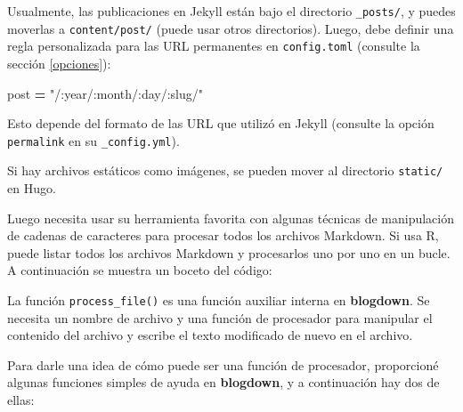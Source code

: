 \documentclass[12pt,]{krantz}
\makeatletter
\newenvironment{Shaded}{\begin{snugshade}}{\end{snugshade}}
\newcommand{\CommentTok}[1]{\textcolor[rgb]{0.56,0.35,0.01}{\textit{#1}}}
\newcommand{\ControlFlowTok}[1]{\textcolor[rgb]{0.13,0.29,0.53}{\textbf{#1}}}
\newcommand{\DataTypeTok}[1]{\textcolor[rgb]{0.13,0.29,0.53}{#1}}
\newcommand{\KeywordTok}[1]{\textcolor[rgb]{0.13,0.29,0.53}{\textbf{#1}}}
\newcommand{\NormalTok}[1]{#1}
\newcommand{\OperatorTok}[1]{\textcolor[rgb]{0.81,0.36,0.00}{\textbf{#1}}}
\newcommand{\OtherTok}[1]{\textcolor[rgb]{0.56,0.35,0.01}{#1}}
\newcommand{\StringTok}[1]{\textcolor[rgb]{0.31,0.60,0.02}{#1}}
\newenvironment{kframe}{%
\medskip{}
\setlength{\fboxsep}{.8em}
 \def\at@end@of@kframe{}%
 \ifinner\ifhmode%
  \def\at@end@of@kframe{\end{minipage}}%
  \begin{minipage}{\columnwidth}%
 \fi\fi%
 \def\FrameCommand##1{\hskip\@totalleftmargin \hskip-\fboxsep
 \colorbox{shadecolor}{##1}\hskip-\fboxsep
     \hskip-\linewidth \hskip-\@totalleftmargin \hskip\columnwidth}%
 \MakeFramed {\advance\hsize-\width
   \@totalleftmargin\z@ \linewidth\hsize
   \@setminipage}}%
 {\par\unskip\endMakeFramed%
 \at@end@of@kframe}
\renewenvironment{Shaded}{\begin{kframe}}{\end{kframe}}
\theoremstyle{definition}
\theoremstyle{definition}
\theoremstyle{definition}
\theoremstyle{remark}
\makeatother
\begin{document}
Usualmente, las publicaciones en Jekyll están bajo el directorio
\texttt{\_posts/}, y puedes moverlas a \texttt{content/post/} (puede
usar otros directorios). Luego, debe definir una regla personalizada
para las URL permanentes en \texttt{config.toml} (consulte la sección
\ref{opciones}):

\begin{Shaded}
\begin{Highlighting}[]
\NormalTok{[permalinks]}
\NormalTok{    post }\OperatorTok{=} \StringTok{"/:year/:month/:day/:slug/"}
\end{Highlighting}
\end{Shaded}

Esto depende del formato de las URL que utilizó en Jekyll (consulte la
opción \texttt{permalink} en su \texttt{\_config.yml}).

Si hay archivos estáticos como imágenes, se pueden mover al directorio
\texttt{static/} en Hugo.

Luego necesita usar su herramienta favorita con algunas técnicas de
manipulación de cadenas de caracteres para procesar todos los archivos
Markdown. Si usa R, puede listar todos los archivos Markdown y
procesarlos uno por uno en un bucle. A continuación se muestra un boceto
del código:

\begin{Shaded}
\end{Shaded}

La función \texttt{process\_file()} es una función auxiliar interna en
\textbf{blogdown}. Se necesita un nombre de archivo y una función de
procesador para manipular el contenido del archivo y escribe el texto
modificado de nuevo en el archivo.

Para darle una idea de cómo puede ser una función de procesador,
proporcioné algunas funciones simples de ayuda en \textbf{blogdown}, y a
continuación hay dos de ellas:
\end{document}
